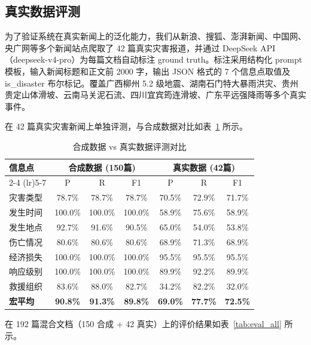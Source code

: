 \documentclass[12pt, a4paper]{ctexart}
\begin{document}
\subsection{真实数据评测}

为了验证系统在真实新闻上的泛化能力，我们从新浪、搜狐、澎湃新闻、中国网、央广网等多个新闻站点爬取了 42 篇真实灾害报道，并通过 DeepSeek API（deepseek-v4-pro）为每篇文档自动标注 ground truth。标注采用结构化 prompt 模板，输入新闻标题和正文前 2000 字，输出 JSON 格式的 7 个信息点取值及 is\_disaster 布尔标记。覆盖广西柳州 5.2 级地震、湖南石门特大暴雨洪灾、贵州贵定山体滑坡、云南马关泥石流、四川宜宾筠连滑坡、广东平远强降雨等多个真实事件。

在 42 篇真实灾害新闻上单独评测，与合成数据对比如表~\ref{tab:eval_real} 所示。

\begin{table}[H]
\centering
\caption{合成数据 vs 真实数据评测对比}
\label{tab:eval_real}
\begin{tabular}{lcccccc}
\toprule
\multirow{2}{*}{\textbf{信息点}} & \multicolumn{3}{c}{\textbf{合成数据 (150篇)}} & \multicolumn{3}{c}{\textbf{真实数据 (42篇)}} \\
\cmidrule(lr){2-4} \cmidrule(lr){5-7}
 & P & R & F1 & P & R & F1 \\
\midrule
灾害类型 & 78.7\% & 78.7\% & 78.7\% & 70.5\% & 72.9\% & 71.7\% \\
发生时间 & 100.0\% & 100.0\% & 100.0\% & 58.9\% & 75.6\% & 58.9\% \\
发生地点 & 92.7\% & 91.6\% & 90.5\% & 65.0\% & 54.0\% & 53.8\% \\
伤亡情况 & 80.6\% & 80.6\% & 80.6\% & 68.9\% & 71.3\% & 68.9\% \\
经济损失 & 100.0\% & 100.0\% & 100.0\% & 95.5\% & 95.5\% & 95.5\% \\
响应级别 & 100.0\% & 100.0\% & 100.0\% & 89.9\% & 92.2\% & 89.9\% \\
救援组织 & 83.6\% & 88.0\% & 82.7\% & 34.2\% & 82.2\% & 32.0\% \\
\midrule
\textbf{宏平均} & \textbf{90.8\%} & \textbf{91.3\%} & \textbf{89.8\%} & \textbf{69.0\%} & \textbf{77.7\%} & \textbf{72.5\%} \\
\bottomrule
\end{tabular}
\end{table}

在 192 篇混合文档（150 合成 + 42 真实）上的评价结果如表~\ref{tab:eval_all} 所示。
\end{document}

